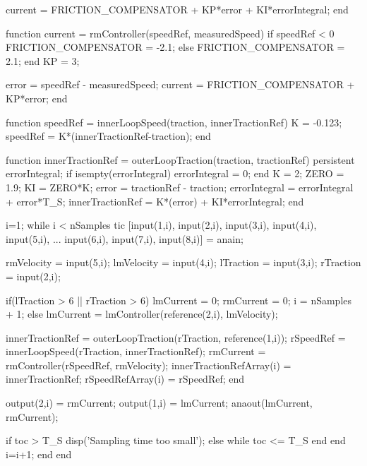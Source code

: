 \begin{matlabcode}
    current = FRICTION_COMPENSATOR + KP*error + KI*errorIntegral;
  end

  function current = rmController(speedRef, measuredSpeed)
    if speedRef < 0
      FRICTION_COMPENSATOR  = -2.1;
    else
      FRICTION_COMPENSATOR  = 2.1;
    end
    KP = 3;

    error = speedRef - measuredSpeed;
    current = FRICTION_COMPENSATOR + KP*error;
  end

  function speedRef = innerLoopSpeed(traction, innerTractionRef)
    K = -0.123;
    speedRef = K*(innerTractionRef-traction);
  end

  function innerTractionRef = outerLoopTraction(traction, tractionRef)
    persistent errorIntegral;
    if isempty(errorIntegral)
      errorIntegral = 0;
    end
    K = 2;
    ZERO = 1.9;
    KI = ZERO*K;
    error = tractionRef - traction;
    errorIntegral = errorIntegral + error*T_S;
    innerTractionRef = K*(error) + KI*errorIntegral;
  end


  i=1;
  while i < nSamples
    tic %
    [input(1,i), input(2,i), input(3,i), input(4,i), input(5,i), ...
      input(6,i), input(7,i), input(8,i)]  = anain; %

    rmVelocity = input(5,i); %
    lmVelocity = input(4,i);
    lTraction = input(3,i);
    rTraction = input(2,i);

    if(lTraction > 6 || rTraction > 6) %
      lmCurrent = 0;
      rmCurrent = 0;
      i = nSamples + 1;
    else
      lmCurrent = lmController(reference(2,i), lmVelocity);

      innerTractionRef = outerLoopTraction(rTraction, reference(1,i));
      rSpeedRef = innerLoopSpeed(rTraction, innerTractionRef);
      rmCurrent = rmController(rSpeedRef, rmVelocity);
      innerTractionRefArray(i) = innerTractionRef;
      rSpeedRefArray(i) = rSpeedRef;
    end

    output(2,i) = rmCurrent;
    output(1,i) = lmCurrent;
    anaout(lmCurrent, rmCurrent);

    if toc > T_S
      disp('Sampling time too small');%
    else
      while toc <= T_S
      end
    end
    i=i+1;
  end
end
\end{matlabcode}

